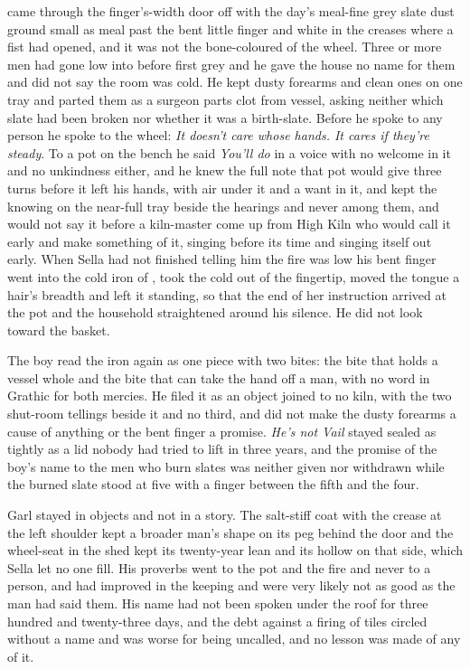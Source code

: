  came through the finger's-width door off  with the day's meal-fine grey slate dust ground small as meal past the bent little finger and white in the creases where a fist had opened, and it was not the bone-coloured  of the wheel. Three or more men had gone low into  before first grey and he gave the house no name for them and did not say the room was cold. He kept dusty forearms and clean ones on one tray and parted them as a surgeon parts clot from vessel, asking neither which slate had been broken nor whether it was a birth-slate. Before he spoke to any person he spoke to the wheel: \emph{It doesn't care whose hands. It cares if they're steady}. To a pot on the bench he said \emph{You'll do} in a voice with no welcome in it and no unkindness either, and he knew the full note that pot would give three turns before it left his hands, with air under it and a want in it, and kept the knowing on the near-full tray beside the hearings and never among them, and would not say it before a kiln-master come up from High Kiln who would call it early and make something of it, singing before its time and singing itself out early. When Sella had not finished telling him the fire was low his bent finger went into the cold iron of , took the cold out of the fingertip, moved the tongue a hair's breadth and left it standing, so that the end of her instruction arrived at the pot and the household straightened around his silence. He did not look toward the basket.

The boy read the iron again as one piece with two bites: the bite that holds a vessel whole and the bite that can take the hand off a man, with no word in Grathic for both mercies. He filed it as an object joined to no kiln, with the two shut-room tellings beside it and no third, and did not make the dusty forearms a cause of anything or the bent finger a promise. \emph{He's not Vail} stayed sealed as tightly as a lid nobody had tried to lift in three years, and the promise of the boy's name to the men who burn slates was neither given nor withdrawn while the burned slate stood at five with a finger between the fifth and the four.

Garl stayed in objects and not in a story. The salt-stiff coat with the crease at the left shoulder kept a broader man's shape on its peg behind the door and the wheel-seat in the shed kept its twenty-year lean and its hollow on that side, which Sella let no one fill. His proverbs went to the pot and the fire and never to a person, and had improved in the keeping and were very likely not as good as the man had said them. His name had not been spoken under the roof for three hundred and twenty-three days, and the debt against a firing of tiles circled without a name and was worse for being uncalled, and no lesson was made of any of it.

